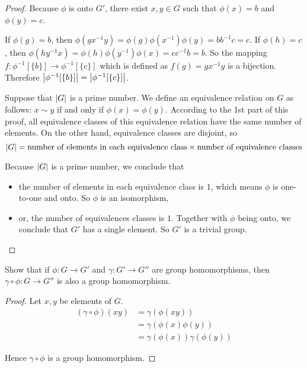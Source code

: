 \begin{proof}
    Because $\phi$ is onto $G'$, there exist $x, y\in G$ such that $\phi(x) = b$ and $\phi(y) = c$.

    If $\phi(g) = b$, then $\phi(gx^{-1}y) = \phi(g)\phi(x^{-1})\phi(y) = bb^{-1}c = c$. If $\phi(h) = c$, then $\phi(hy^{-1}x) = \phi(h)\phi(y^{-1})\phi(x) = cc^{-1}b = b$. So the mapping $f: \phi^{-1}[\{b\}] \to \phi^{-1}[\{c\}]$ which is defined as $f(g) = gx^{-1}y$ is a bijection. Therefore $\left\vert{\phi^{-1}[\{b\}]}\right\vert = \left\vert{\phi^{-1}[\{c\}]}\right\vert$.

    Suppose that $\left\vert{G}\right\vert$ is a prime number. We define an equivalence relation on $G$ as follows: $x\sim y$ if and only if $\phi(x) = \phi(y)$. According to the 1st part of this proof, all equivalence classes of this equivalence relation have the same number of elements. On the other hand, equivalence classes are disjoint, so
    \[
        \left\vert{G}\right\vert = \text{number of elements in each equivalence class} \times \text{number of equivalence classes}
    \]

    Because $\left\vert{G}\right\vert$ is a prime number, we conclude that
    \begin{itemize}
        \item the number of elements in each equivalence class is $1$, which means $\phi$ is one-to-one and onto. So $\phi$ is an isomorphism,
        \item or, the number of equivalences classes is $1$. Together with $\phi$ being onto, we conclude that $G'$ has a single element. So $G'$ is a trivial group.
    \end{itemize}
\end{proof}

\newpage
\begin{exercise}
    Show that if $\phi: G\to G'$ and $\gamma: G'\to G''$ are group homomorphisms, then $\gamma\circ\phi: G\to G''$ is also a group homomorphism.
\end{exercise}

\begin{proof}
    Let $x, y$ be elements of $G$.
    \begin{align*}
        (\gamma\circ\phi)(xy) & = \gamma(\phi(xy))               \\
                              & = \gamma(\phi(x)\phi(y))         \\
                              & = \gamma(\phi(x))\gamma(\phi(y))
    \end{align*}

    Hence $\gamma\circ\phi$ is a group homomorphism.
\end{proof}

